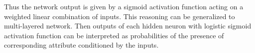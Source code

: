 \documentclass[]{article}
\theoremstyle{definition}
\begin{document}
Thus the network output is given by a sigmoid activation function acting on a weighted linear combination of inputs. This reasoning can be generalized to multi-layered network. Then outputs of each hidden neuron with logistic sigmoid activation function can be interpreted as probabilities of the presence of corresponding attribute conditioned by the inputs. 
\end{document}
